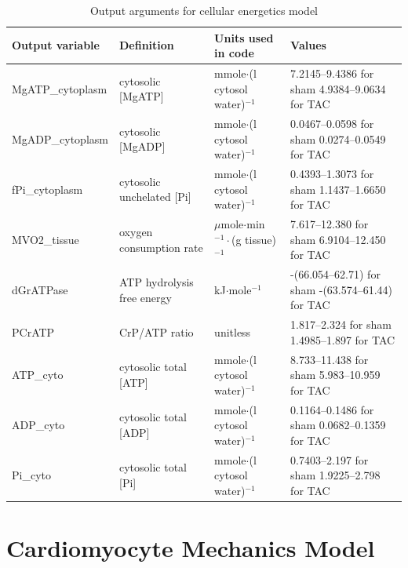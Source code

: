 \documentclass[fleqn,10pt]{physiome}
\begin{document}
\begin{table}[!ht]\centering
\small
\caption{Output arguments for cellular energetics model}\label{tab:4}
\begin{supertabular}{l p{2.8cm} p{2.0cm} p{3.4cm}}
\toprule
Output variable & Definition & Units used in code & Values \\
\midrule

MgATP\_cytoplasm & cytosolic {[MgATP]} & mmole$\cdot$(l cytosol water)$^{-1}$ & 
 7.2145--9.4386 for sham  4.9384--9.0634  for TAC \\

MgADP\_cytoplasm &cytosolic {[MgADP]} & mmole$\cdot$(l cytosol water)$^{-1}$ & 
 0.0467--0.0598  for sham  0.0274--0.0549  for TAC \\

fPi\_cytoplasm & cytosolic unchelated {[Pi]} & mmole$\cdot$(l cytosol water)$^{-1}$ & 
 0.4393--1.3073 for sham  1.1437--1.6650 for TAC \\

MVO2\_tissue & oxygen consumption  rate & $\mu$mole$\cdot$min$^{-1}\cdot$(g tissue)$^{-1}$ & 
7.617--12.380 for sham 6.9104--12.450 for TAC \\

dGrATPase & ATP hydrolysis free energy & kJ$\cdot$mole$^{-1}$ & 
 -(66.054--62.71) for sham -(63.574--61.44) for TAC \\

PCrATP & CrP/ATP ratio & unitless &  
 1.817--2.324 for sham 1.4985--1.897 for TAC \\

ATP\_cyto & cytosolic total {[ATP]} & mmole$\cdot$(l cytosol water)$^{-1}$ & 
 8.733--11.438 for sham 5.983--10.959 for TAC \\

ADP\_cyto & cytosolic total {[ADP]} & mmole$\cdot$(l cytosol water)$^{-1}$ & 
 0.1164--0.1486 for sham 0.0682--0.1359 for TAC \\

Pi\_cyto & cytosolic total {[Pi]} & mmole$\cdot$(l cytosol water)$^{-1}$ & 
 0.7403--2.197 for sham 1.9225--2.798 for TAC \\

\bottomrule 
\end{supertabular}
\end{table}

\section{Cardiomyocyte Mechanics Model}
\end{document}
